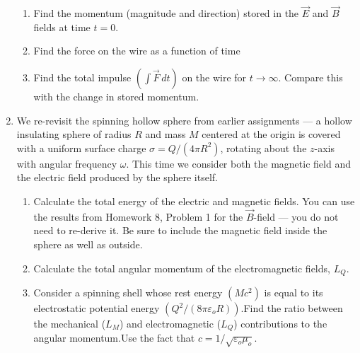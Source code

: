\begin{enumerate}
    \begin{enumerate}

      \item Find the momentum (magnitude and direction) stored in the $\vec{E}$ and $\vec{B}$ fields at time $t=0$.

      \item Find the force on the wire as a function of time

      \item Find the total impulse $\left( \int\vec{F}\,dt \right)$ on the wire for $t\to\infty$. Compare this with the change in stored momentum.

    \end{enumerate}

  \item We re-revisit the spinning hollow sphere from earlier assignments — a hollow insulating sphere of radius $R$ and mass $M$ centered at the origin is covered with a uniform surface charge $\sigma=Q/(4\pi R^2)$, rotating about the $z$-axis with angular frequency $\omega$. This time we consider both the magnetic field and the electric field produced by the sphere itself.

    \begin{enumerate}

      \item Calculate the total energy of the electric and magnetic fields. You can use the results from Homework 8, Problem 1 for the $\vec{B}$-field — you do not need to re-derive it.  Be sure to include the magnetic field inside the sphere as well as outside.

      \item Calculate the total angular momentum of the electromagnetic fields, $L_Q$.

      \item Consider a spinning shell whose rest energy $(Mc^2)$ is equal to its electrostatic potential energy $(Q^2/(8\pi\varepsilon_o R))$.Find the ratio between the mechanical ($L_M$) and electromagnetic ($L_Q$) contributions to the angular momentum.Use the fact that $c=1/\sqrt{\varepsilon_o\mu_o}$.

    \end{enumerate}

\end{enumerate}



